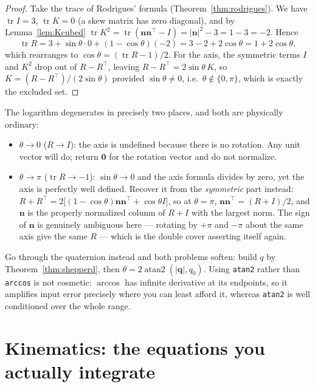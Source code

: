 \documentclass[11pt]{article}
\DeclareMathOperator{\tr}{tr}
\newcommand{\vv}[1]{\bm{#1}}
\theoremstyle{plain}
\theoremstyle{definition}
\begin{document}
\begin{proof}
Take the trace of Rodrigues' formula (Theorem~\ref{thm:rodrigues}). We have $\tr I=3$,
$\tr K=0$ (a skew matrix has zero diagonal), and by Lemma~\ref{lem:Kcubed}
$\tr K^2=\tr(\vv n\vv n^{\!\top}-I)=|\vv n|^2-3=1-3=-2$. Hence
\[
\tr R=3+\sin\theta\cdot0+(1-\cos\theta)(-2)=3-2+2\cos\theta=1+2\cos\theta ,
\]
which rearranges to $\cos\theta=(\tr R-1)/2$. For the axis, the symmetric terms $I$ and $K^2$ drop
out of $R-R^{\!\top}$, leaving $R-R^{\!\top}=2\sin\theta\,K$, so $K=(R-R^{\!\top})/(2\sin\theta)$
provided $\sin\theta\ne0$, i.e.\ $\theta\notin\{0,\pi\}$, which is exactly the excluded set.
\end{proof}

\begin{practical}
The logarithm degenerates in precisely two places, and both are physically ordinary:
\begin{itemize}[leftmargin=1.2em,topsep=2pt]
\item $\theta\to0$ ($R\to I$): the axis is undefined because there is no rotation. Any unit vector
will do; return $\vv 0$ for the rotation vector and do not normalize.
\item $\theta\to\pi$ ($\tr R\to-1$): $\sin\theta\to0$ and the axis formula divides by zero, yet the
axis is perfectly well defined. Recover it from the \emph{symmetric} part instead:
$R+R^{\!\top}=2\big[(1-\cos\theta)\vv n\vv n^{\!\top}+\cos\theta I\big]$, so at $\theta=\pi$,
$\vv n\vv n^{\!\top}=(R+I)/2$, and $\vv n$ is the properly normalized column of $R+I$ with the
largest norm. The sign of $\vv n$ is genuinely ambiguous here --- rotating by $+\pi$ and $-\pi$
about the same axis give the same $R$ --- which is the double cover asserting itself again.
\end{itemize}
Go through the quaternion instead and both problems soften: build $q$ by
Theorem~\ref{thm:shepperd}, then $\theta=2\operatorname{atan2}(|\vv q|,q_0)$. Using
\texttt{atan2} rather than \texttt{arccos} is not cosmetic: $\arccos$ has infinite derivative at its
endpoints, so it amplifies input error precisely where you can least afford it, whereas
\texttt{atan2} is well conditioned over the whole range.
\end{practical}

\section{Kinematics: the equations you actually integrate}
\end{document}
